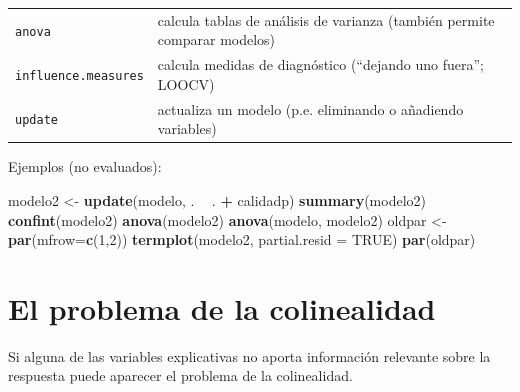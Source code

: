 \documentclass[
  spanish,
]{book}
\newenvironment{Shaded}{\begin{snugshade}}{\end{snugshade}}
\newcommand{\DataTypeTok}[1]{\textcolor[rgb]{0.13,0.29,0.53}{#1}}
\newcommand{\DecValTok}[1]{\textcolor[rgb]{0.00,0.00,0.81}{#1}}
\newcommand{\KeywordTok}[1]{\textcolor[rgb]{0.13,0.29,0.53}{\textbf{#1}}}
\newcommand{\NormalTok}[1]{#1}
\newcommand{\OperatorTok}[1]{\textcolor[rgb]{0.81,0.36,0.00}{\textbf{#1}}}
\newcommand{\OtherTok}[1]{\textcolor[rgb]{0.56,0.35,0.01}{#1}}
\newcommand{\StringTok}[1]{\textcolor[rgb]{0.31,0.60,0.02}{#1}}
\theoremstyle{break}
\theoremstyle{definition}
\theoremstyle{definition}
\theoremstyle{definition}
\theoremstyle{remark}
\begin{document}
\begin{longtable}[]{@{}ll@{}}
\begin{minipage}[t]{0.11\columnwidth}\raggedright
\texttt{anova}\strut
\end{minipage} & \begin{minipage}[t]{0.83\columnwidth}\raggedright
calcula tablas de análisis de varianza (también permite comparar modelos)\strut
\end{minipage}\tabularnewline
\begin{minipage}[t]{0.11\columnwidth}\raggedright
\texttt{influence.measures}\strut
\end{minipage} & \begin{minipage}[t]{0.83\columnwidth}\raggedright
calcula medidas de diagnóstico (``dejando uno fuera''; LOOCV)\strut
\end{minipage}\tabularnewline
\begin{minipage}[t]{0.11\columnwidth}\raggedright
\texttt{update}\strut
\end{minipage} & \begin{minipage}[t]{0.83\columnwidth}\raggedright
actualiza un modelo (p.e. eliminando o añadiendo variables)\strut
\end{minipage}\tabularnewline
\bottomrule
\end{longtable}

Ejemplos (no evaluados):

\begin{Shaded}
\begin{Highlighting}[]
\NormalTok{modelo2 <-}\StringTok{ }\KeywordTok{update}\NormalTok{(modelo, . }\OperatorTok{~}\StringTok{ }\NormalTok{. }\OperatorTok{+}\StringTok{ }\NormalTok{calidadp)}
\KeywordTok{summary}\NormalTok{(modelo2)}
\KeywordTok{confint}\NormalTok{(modelo2)}
\KeywordTok{anova}\NormalTok{(modelo2)}
\KeywordTok{anova}\NormalTok{(modelo, modelo2)}
\NormalTok{oldpar <-}\StringTok{ }\KeywordTok{par}\NormalTok{(}\DataTypeTok{mfrow=}\KeywordTok{c}\NormalTok{(}\DecValTok{1}\NormalTok{,}\DecValTok{2}\NormalTok{))}
\KeywordTok{termplot}\NormalTok{(modelo2, }\DataTypeTok{partial.resid =} \OtherTok{TRUE}\NormalTok{)}
\KeywordTok{par}\NormalTok{(oldpar)}
\end{Highlighting}
\end{Shaded}

\hypertarget{colinealidad}{%
\section{El problema de la colinealidad}\label{colinealidad}}

Si alguna de las variables explicativas no aporta información relevante sobre la respuesta puede aparecer el problema de la colinealidad.
\end{document}
